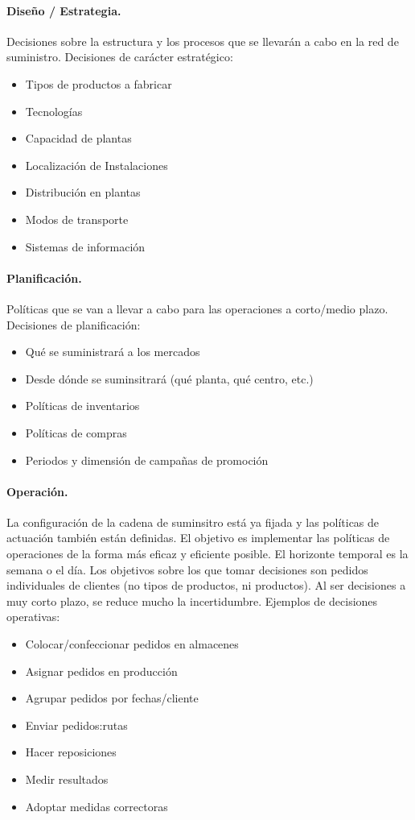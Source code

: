\paragraph{Diseño / Estrategia.} Decisiones sobre la estructura y los procesos que se llevarán a cabo en la red de suministro. Decisiones de carácter estratégico:
\begin{itemize}
    \item Tipos de productos a fabricar
    \item Tecnologías
    \item Capacidad de plantas
    \item Localización de Instalaciones
    \item Distribución en plantas
    \item Modos de transporte
    \item Sistemas de información
\end{itemize}

\paragraph{Planificación.} Políticas que se van a llevar a cabo para las operaciones a corto/medio plazo. Decisiones de planificación:
\begin{itemize}
    \item Qué se suministrará a los mercados
    \item Desde dónde se suminsitrará (qué planta, qué centro, etc.)
    \item Políticas de inventarios
    \item Políticas de compras
    \item Periodos y dimensión de campañas de promoción
\end{itemize}

\paragraph{Operación.} La configuración de la cadena de suminsitro está ya fijada y las políticas de actuación también están definidas. El objetivo es implementar las políticas de operaciones de la forma más eficaz y eficiente posible. El horizonte temporal es la semana o el día. Los objetivos sobre los que tomar decisiones son pedidos individuales de clientes (no tipos de productos, ni productos). Al ser decisiones a muy corto plazo, se reduce mucho la incertidumbre. Ejemplos de decisiones operativas:
\begin{itemize}
    \item Colocar/confeccionar pedidos en almacenes
    \item Asignar pedidos en producción
    \item Agrupar pedidos por fechas/cliente
    \item Enviar pedidos:rutas
    \item Hacer reposiciones
    \item Medir resultados
    \item Adoptar medidas correctoras
\end{itemize}

